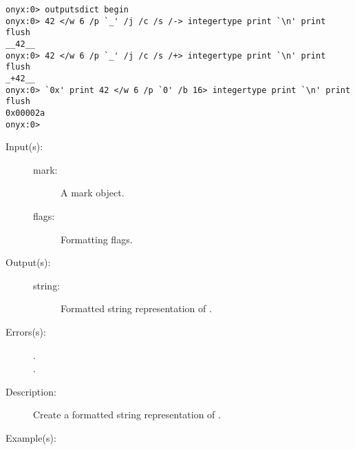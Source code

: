 \begin{description}
\begin{description}
\begin{verbatim}
onyx:0> outputsdict begin
onyx:0> 42 </w 6 /p `_' /j /c /s /-> integertype print `\n' print flush
__42__
onyx:0> 42 </w 6 /p `_' /j /c /s /+> integertype print `\n' print flush
_+42__
onyx:0> `0x' print 42 </w 6 /p `0' /b 16> integertype print `\n' print flush
0x00002a
onyx:0>
		\end{verbatim}
	\end{description}
\label{outputsdict:marktype}
\item[{\onyxop{mark flags}{marktype}{string}}: ]
	\begin{description}\item[]
	\item[Input(s): ]
		\begin{description}\item[]
		\item[mark: ]
			A mark object.
		\item[flags: ]
			Formatting flags.
		\end{description}
	\item[Output(s): ]
		\begin{description}\item[]
		\item[string: ]
			Formatted string representation of .
		\end{description}
	\item[Errors(s): ]
		\begin{description}\item[]
		\item[.]
		\item[.]
		\end{description}
	\item[Description: ]
		Create a formatted string representation of .
	\item[Example(s): ]\begin{verbatim}


\end{verbatim}
\end{description}
\end{description}
